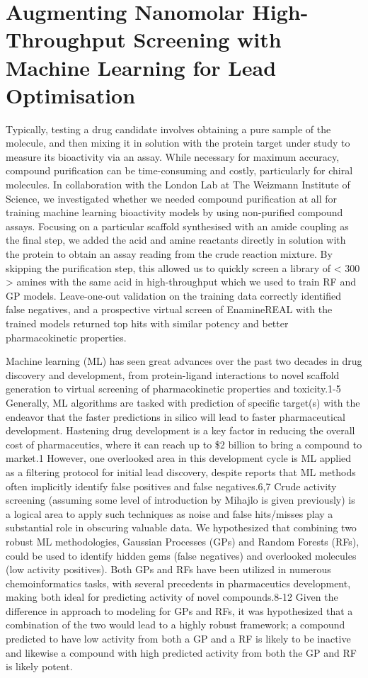 \chapter{Augmenting Nanomolar High-Throughput Screening with Machine Learning for Lead Optimisation}\label{ch:testing}

Typically, testing a drug candidate involves obtaining a pure sample of the molecule, and then mixing it in solution with the protein target under study to measure its bioactivity via an assay. While necessary for maximum accuracy, compound purification can be time-consuming and costly, particularly for chiral molecules. In collaboration with the London Lab at The Weizmann Institute of Science, we investigated whether we needed compound purification at all for training machine learning bioactivity models by using non-purified compound assays. Focusing on a particular scaffold synthesised with an amide coupling as the final step, we added the acid and amine reactants directly in solution with the protein to obtain an assay reading from the crude reaction mixture. By skipping the purification step, this allowed us to quickly screen a library of < 300 > amines with the same acid in high-throughput which we used to train RF and GP models. Leave-one-out validation on the training data correctly identified false negatives, and a prospective virtual screen of EnamineREAL with the trained models returned top hits with similar potency and better pharmacokinetic properties.

Machine learning (ML) has seen great advances over the past two decades in drug discovery and development, from protein-ligand interactions to novel scaffold generation to virtual screening of pharmacokinetic properties and toxicity.1-5 Generally, ML algorithms are tasked with prediction of specific target(s) with the endeavor that the faster predictions in silico will lead to faster pharmaceutical development. Hastening drug development is a key factor in reducing the overall cost of pharmaceutics, where it can reach up to \$2 billion to bring a compound to market.1 However, one overlooked area in this development cycle is ML applied as a filtering protocol for initial lead discovery, despite reports that ML methods often implicitly identify false positives and false negatives.6,7 Crude activity screening (assuming some level of introduction by Mihajlo is given previously) is a logical area to apply such techniques as noise and false hits/misses play a substantial role in obscuring valuable data. We hypothesized that combining two robust ML methodologies, Gaussian Processes (GPs) and Random Forests (RFs), could be used to identify hidden gems (false negatives) and overlooked molecules (low activity positives). Both GPs and RFs have been utilized in numerous chemoinformatics tasks, with several precedents in pharmaceutics development, making both ideal for predicting activity of novel compounds.8-12 Given the difference in approach to modeling for GPs and RFs, it was hypothesized that a combination of the two would lead to a highly robust framework; a compound predicted to have low activity from both a GP and a RF is likely to be inactive and likewise a compound with high predicted activity from both the GP and RF is likely potent.

